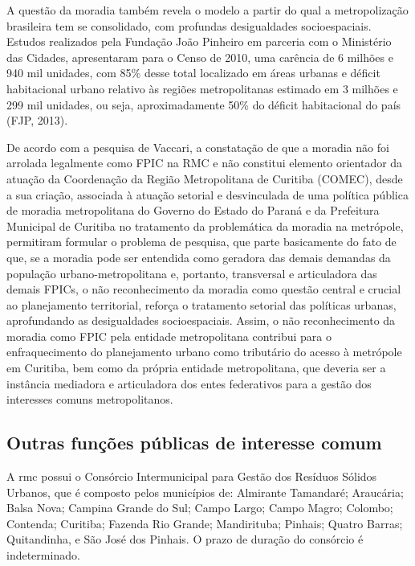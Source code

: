 	A questão da moradia também revela o modelo a partir do qual a metropolização brasileira tem se consolidado, com profundas desigualdades socioespaciais. Estudos realizados pela Fundação João Pinheiro em parceria com o Ministério das Cidades, apresentaram para o Censo de 2010, uma carência de 6 milhões e 940 mil unidades, com 85\% desse total localizado em áreas urbanas e déficit habitacional urbano relativo às regiões metropolitanas estimado em 3 milhões e 299 mil unidades, ou seja, aproximadamente 50\% do déficit habitacional do país (FJP, 2013).
	
	De acordo com a pesquisa de Vaccari, a constatação de que a moradia não foi arrolada legalmente como FPIC na RMC e não constitui elemento orientador da atuação da Coordenação da Região Metropolitana de Curitiba (COMEC), desde a sua criação, associada à atuação setorial e desvinculada de uma política pública de moradia metropolitana do Governo do Estado do Paraná e da Prefeitura Municipal de Curitiba no tratamento da problemática da moradia na metrópole, permitiram formular o problema de pesquisa, que parte basicamente do fato de que, se a moradia pode ser entendida como geradora das demais demandas da população urbano-metropolitana e, portanto, transversal e articuladora das demais FPICs, o não reconhecimento da moradia como questão central e crucial ao planejamento territorial, reforça o tratamento setorial das políticas urbanas, aprofundando as desigualdades socioespaciais. Assim, o não reconhecimento da moradia como FPIC pela entidade metropolitana contribui para o enfraquecimento do planejamento urbano como tributário do acesso à metrópole em Curitiba, bem como da própria entidade metropolitana, que deveria ser a instância mediadora e articuladora dos entes federativos para a gestão dos interesses comuns metropolitanos.
	
	\subsection{Outras funções públicas de interesse comum}
	
	A \gls{rmc} possui o Consórcio Intermunicipal para Gestão dos Resíduos Sólidos Urbanos, que é composto pelos municípios de: Almirante Tamandaré; Araucária; Balsa Nova; Campina Grande do Sul; Campo Largo; Campo Magro; Colombo; Contenda; Curitiba; Fazenda Rio Grande; Mandirituba; Pinhais; Quatro Barras; Quitandinha, e São José dos Pinhais. O prazo de duração do consórcio é indeterminado.
	
